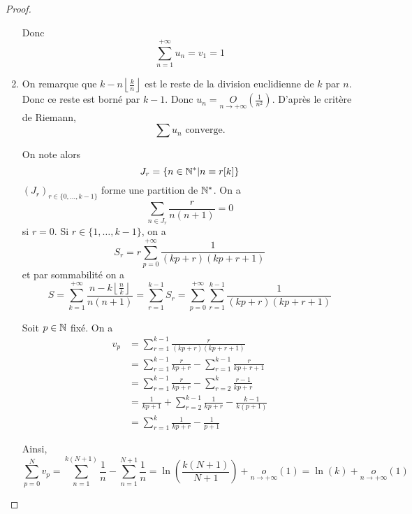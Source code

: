 \begin{proof}
\begin{enumerate}
		Donc 
		\begin{equation}\boxed{\sum_{n=1}^{+\infty}u_{n}=v_{1}=1}\end{equation}

		\item On remarque que $k-n\left\lfloor\frac{k}{n}\right\rfloor$ est le reste de la division euclidienne de $k$ par $n$. Donc ce reste est borné par $k-1$. Donc $u_{n}=\underset{n\to+\infty}{O}\left(\frac{1}{n^{2}}\right)$. D'après le critère de Riemann,
		\begin{equation}\boxed{\sum u_{n}\text{ converge.}}\end{equation}

		On note alors 
		\begin{equation}J_{r}=\left\{n\in\mathbb{N}^{*}\middle| n\equiv r[k]\right\}\end{equation}
		$(J_{r})_{r\in\{0,\dots,k-1\}}$ forme une partition de $\mathbb{N}^{*}$. On a 
		\begin{equation}\sum_{n\in J_{r}}\frac{r}{n(n+1)}=0\end{equation}
		si $r=0$. Si $r\in\{1,\dots,k-1\}$, on a 
		\begin{equation}S_{r}=r\sum_{p=0}^{+\infty}\frac{1}{(kp+r)(kp+r+1)}\end{equation}
		et par sommabilité on a 
		\begin{equation}S=\sum_{k=1}^{+\infty}\frac{n-k\left\lfloor\frac{n}{k}\right\rfloor}{n(n+1)}=\sum_{r=1}^{k-1}S_{r}=\sum_{p=0}^{+\infty}\sum_{r=1}^{k-1}\frac{1}{(kp+r)(kp+r+1)}\end{equation}

		Soit $p\in\mathbb{N}$ fixé. On a 
		\begin{align}
			v_{p}
			&=\sum_{r=1}^{k-1}\frac{r}{(kp+r)(kp+r+1)}\\
			&=\sum_{r=1}^{k-1}\frac{r}{kp+r}-\sum_{r=1}^{k-1}\frac{r}{kp+r+1}\\
			&=\sum_{r=1}^{k-1}\frac{r}{kp+r}-\sum_{r=2}^{k}\frac{r-1}{kp+r}\\
			&=\frac{1}{kp+1}+\sum_{r=2}^{k-1}\frac{1}{kp+r}-\frac{k-1}{k(p+1)}\\
			&=\sum_{r=1}^{k}\frac{1}{kp+r}-\frac{1}{p+1}
		\end{align}

		Ainsi, 
		\begin{equation}\sum_{p=0}^{N}v_{p}=\sum_{n=1}^{k(N+1)}\frac{1}{n}-\sum_{n=1}^{N+1}\frac{1}{n}=\ln\left(\frac{k(N+1)}{N+1}\right)+\underset{n\to+\infty}{o}\left(1\right)=\ln(k)+\underset{n\to+\infty}{o}\left(1\right)\end{equation}


\end{enumerate}
\end{proof}
